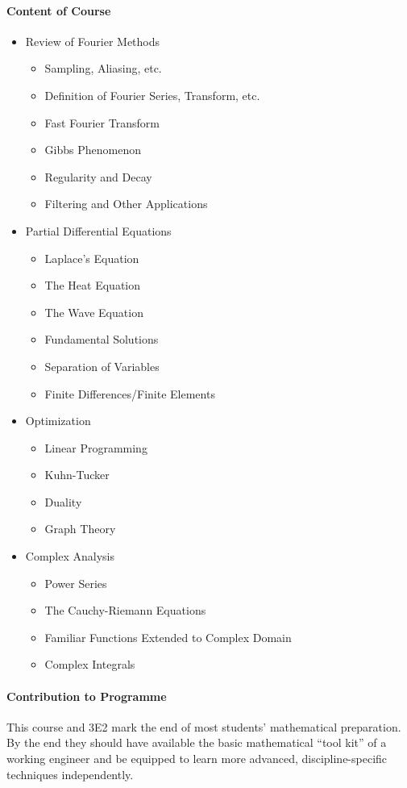 \paragraph{Content of Course}
\begin{itemize}
  \item Review of Fourier Methods
  \begin{itemize}
    \item Sampling, Aliasing, etc.
    \item Definition of Fourier Series, Transform, etc.
    \item Fast Fourier Transform
    \item Gibbs Phenomenon
    \item Regularity and Decay
    \item Filtering and Other Applications
  \end{itemize}
  \item Partial Differential Equations
  \begin{itemize}
    \item Laplace's Equation
    \item The Heat Equation
    \item The Wave Equation
    \item Fundamental Solutions
    \item Separation of Variables
    \item Finite Differences/Finite Elements
  \end{itemize}
  \item Optimization
  \begin{itemize}
    \item Linear Programming
    \item Kuhn-Tucker
    \item Duality
    \item Graph Theory
  \end{itemize}
  \item Complex Analysis
  \begin{itemize}
    \item Power Series
    \item The Cauchy-Riemann Equations
    \item Familiar Functions Extended to Complex Domain
    \item Complex Integrals
  \end{itemize}
\end{itemize}
\paragraph{Contribution to Programme}
This course and 3E2 mark the end of most students' mathematical
preparation.  By the end they should have available the basic
mathematical ``tool kit'' of a working engineer and be equipped
to learn more advanced, discipline-specific techniques independently.

